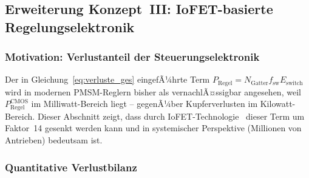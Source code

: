 ﻿\documentclass[12pt, a4paper]{report}
\theoremstyle{definition}
\theoremstyle{remark}
\begin{document}
\subsection{Erweiterung Konzept~III: IoFET-basierte Regelungselektronik}
\label{ss:iofet_regelung}
\label{ssec:iofet_regelung}

\subsubsection{Motivation: Verlustanteil der Steuerungselektronik}

Der in Gleichung~\eqref{eq:verluste_ges} eingefÃ¼hrte Term
$P_\text{Regel} = N_\text{Gatter} f_\text{sw} E_\text{switch}$ wird in
modernen PMSM-Reglern bisher als vernachlÃ¤ssigbar angesehen, weil
$P_\text{Regel}^\text{CMOS}$ im Milliwatt-Bereich liegt -- gegenÃ¼ber
Kupferverlusten im Kilowatt-Bereich. Dieser Abschnitt zeigt, dass durch
IoFET-Technologie~\cite{ionotronik2026} dieser Term um Faktor~14 gesenkt
werden kann und in systemischer Perspektive (Millionen von Antrieben) bedeutsam
ist.

\subsubsection{Quantitative Verlustbilanz}
\end{document}
